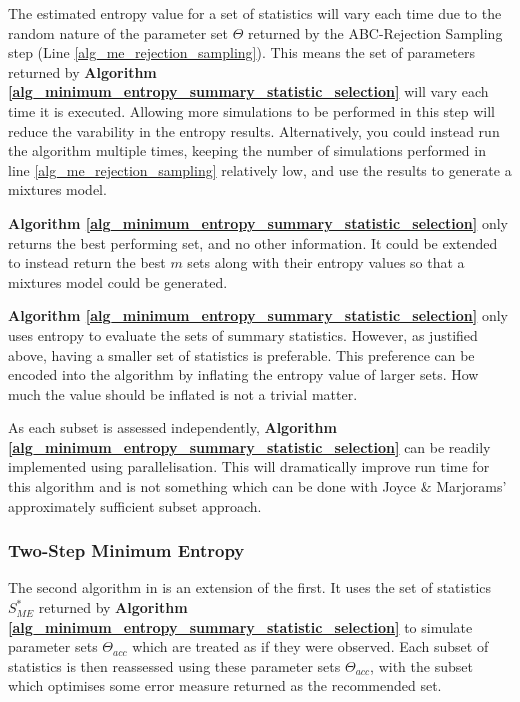 \documentclass[11pt,a4paper]{article}
\theoremstyle{break}
\begin{document}
  \par The estimated entropy value for a set of statistics will vary each time due to the random nature of the parameter set $\Theta$ returned by the ABC-Rejection Sampling step (Line \ref{alg_me_rejection_sampling}). This means the set of parameters returned by \textbf{Algorithm \ref{alg_minimum_entropy_summary_statistic_selection}} will vary each time it is executed. Allowing more simulations to be performed in this step will reduce the varability in the entropy results. Alternatively, you could instead run the algorithm multiple times, keeping the number of simulations performed in line \ref{alg_me_rejection_sampling} relatively low, and use the results to generate a mixtures model.

  \par \textbf{Algorithm \ref{alg_minimum_entropy_summary_statistic_selection}} only returns the best performing set, and no other information. It could be extended to instead return the best $m$ sets along with their entropy values so that a mixtures model could be generated.

  \par \textbf{Algorithm \ref{alg_minimum_entropy_summary_statistic_selection}} only uses entropy to evaluate the sets of summary statistics. However, as justified above, having a smaller set of statistics is preferable. This preference can be encoded into the algorithm by inflating the entropy value of larger sets. How much the value should be inflated is not a trivial matter. %

  \par As each subset is assessed independently, \textbf{Algorithm \ref{alg_minimum_entropy_summary_statistic_selection}} can be readily implemented using parallelisation. This will dramatically improve run time for this algorithm and is not something which can be done with Joyce \& Marjorams' approximately sufficient subset approach.


\subsubsection{Two-Step Minimum Entropy}\label{sec_two_step_minimum_entropy}

  \par The second algorithm in \cite[]{on_optimal_selection_of_summary_stats_for_ABC} is an extension of the first. It uses the set of statistics $S_{ME}^*$ returned by \textbf{Algorithm \ref{alg_minimum_entropy_summary_statistic_selection}} to simulate parameter sets $\Theta_{acc}$ which are treated as if they were observed. Each subset of statistics is then reassessed using these parameter sets $\Theta_{acc}$, with the subset which optimises some error measure returned as the recommended set.
\end{document}
